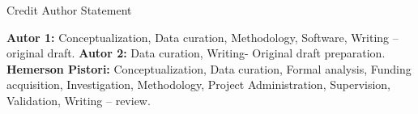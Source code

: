 \documentclass{article}
\begin{document}


\begin{center}
{\huge Credit Author Statement}
\end{center}

\vspace{1cm} %


\noindent 
\textbf{Autor 1:} Conceptualization, Data curation, Methodology, Software, Writing -- original draft. \textbf{Autor 2:} Data curation, Writing- Original draft preparation. \textbf{Hemerson Pistori:} Conceptualization, Data curation, Formal analysis, Funding acquisition, Investigation, Methodology, Project Administration, Supervision, Validation, Writing -- review.
\end{document}
